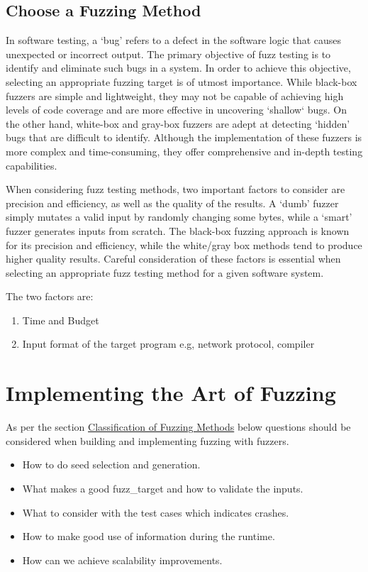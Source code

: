 \subsection{Choose a Fuzzing Method}
In software testing, a `bug' refers to a defect in the software logic that causes unexpected or
incorrect output. The primary objective of fuzz testing is to identify and eliminate such bugs
in a system. In order to achieve this objective, selecting an appropriate fuzzing target is of
utmost importance. While black-box fuzzers are simple and lightweight, they may not be capable
of achieving high levels of code coverage and are more effective in uncovering `shallow`
bugs. On the other hand, white-box and gray-box fuzzers are adept at detecting  `hidden' bugs
that are difficult to identify. Although the implementation of these fuzzers is more complex
and time-consuming, they offer comprehensive and in-depth testing capabilities.

When considering fuzz testing methods, two important factors to consider are precision and efficiency,
as well as the quality of the results. A `dumb' fuzzer simply mutates a valid input by
randomly changing some bytes, while a `smart' fuzzer generates inputs from scratch.
The black-box fuzzing approach is known for its precision and efficiency, while the white/gray
box methods tend to produce higher quality results. Careful consideration of these factors is
essential when selecting an appropriate fuzz testing method for a given software system.

The two factors are:
\begin{enumerate}
        \item Time and Budget
        \item Input format of the target program e.g, network protocol, compiler
\end{enumerate}

\section{Implementing the Art of Fuzzing}
As per the section \hyperref[sec:fuzzing_methods]{Classification of Fuzzing Methods} below questions
should be considered when building and implementing fuzzing with fuzzers.

\begin{itemize}
        \item How to do seed selection and generation.
        \item What makes a good \gls{fuzz_target} and how to validate the inputs.
        \item What to consider with the test cases which indicates crashes.
        \item How to make good use of information during the runtime.
        \item How can we achieve scalability improvements.\newline
\end{itemize}

